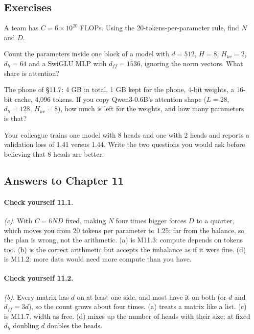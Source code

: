 \subsection*{Exercises}

\begin{exercise}
A team has $C=6\times10^{20}$ FLOPs. Using the 20-tokens-per-parameter rule, find $N$ and $D$.
\end{exercise}

\begin{exercise}
Count the parameters inside one block of a model with $d=512$, $H=8$, $H_{kv}=2$, $d_h=64$ and a SwiGLU MLP
with $d_{ff}=1536$, ignoring the norm vectors. What share is attention?
\end{exercise}

\begin{exercise}
The phone of \S11.7: 4 GB in total, 1 GB kept for the phone, 4-bit weights, a 16-bit cache, 4{,}096
tokens. If you copy Qwen3-0.6B's attention shape ($L=28$, $d_h=128$, $H_{kv}=8$), how much is left for the
weights, and how many parameters is that?
\end{exercise}

\begin{exercise}
Your colleague trains one model with 8 heads and one with 2 heads and reports a validation loss of 1.41
versus 1.44. Write the two questions you would ask before believing that 8 heads are better.
\end{exercise}

\subsection*{Answers to Chapter 11}

\paragraph{Check yourself 11.1.} \emph{(c)}. With $C=6ND$ fixed, making $N$ four times bigger forces $D$
to a quarter, which moves you from 20 tokens per parameter to 1.25: far from the balance, so the plan is
wrong, not the arithmetic. (a) is M11.3: compute depends on tokens too. (b) is the correct arithmetic but
accepts the imbalance as if it were fine. (d) is M11.2: more data would need more compute than you have.

\paragraph{Check yourself 11.2.} \emph{(b)}. Every matrix has $d$ on at least one side, and most have it
on both (or $d$ and $d_{ff}=3d$), so the count grows about four times. (a) treats a matrix like a list.
(c) is M11.7, width as free. (d) mixes up the number of heads with their size; at fixed $d_h$ doubling $d$
doubles the heads.

